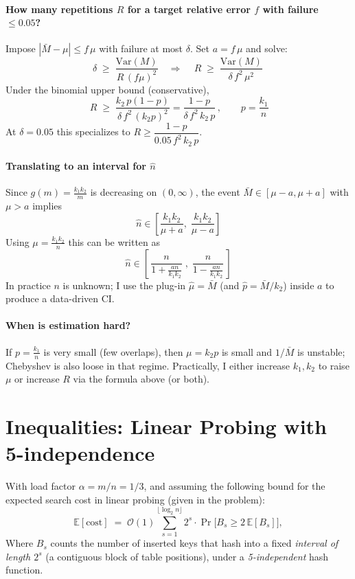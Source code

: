 \documentclass[11pt]{article}
\begin{document}
\paragraph{How many repetitions $R$ for a target relative error $f$ with failure $\le 0.05$?}
Impose $|\bar M-\mu|\le f\,\mu$ with failure at most $\delta$. Set $a=f\,\mu$ and solve:
\[
\delta\;\ge\; \frac{\mathrm{Var}(M)}{R\,(f\mu)^2}
\quad\Longrightarrow\quad
\,R\;\ge\;\frac{\mathrm{Var}(M)}{\delta\,f^2\,\mu^2}\,
\]
Under the binomial upper bound (conservative),
\[
\,R\;\ge\;\frac{k_2\,p(1-p)}{\delta\,f^2\,(k_2p)^2}
=\frac{1-p}{\delta\,f^2\,k_2\,p}\,,
\qquad p=\frac{k_1}{n}
\]
At $\delta=0.05$ this specializes to $R\ge \dfrac{1-p}{0.05\,f^2\,k_2\,p}$.

\paragraph{Translating to an interval for $\hat n$}
Since $g(m)=\frac{k_1k_2}{m}$ is decreasing on $(0,\infty)$, the event
$\bar M\in[\mu-a,\mu+a]$ with $\mu>a$ implies
\[
\hat n \in \left[\frac{k_1k_2}{\mu+a},\;\frac{k_1k_2}{\mu-a}\right]
\]
Using $\mu=\frac{k_1k_2}{n}$ this can be written as
\[
\hat n \in \left[\,\frac{n}{1+\frac{a n}{k_1k_2}}\;,\;\frac{n}{1-\frac{a n}{k_1k_2}}\,\right]
\]
In practice $n$ is unknown; I use the plug-in $\hat \mu=\bar M$ (and $\hat p=\bar M/k_2$) inside $a$ to produce a data-driven CI.

\paragraph{When is estimation hard?}
If $p=\frac{k_1}{n}$ is very small (few overlaps), then $\mu=k_2p$ is small and $1/\bar M$ is unstable; Chebyshev is also loose in that regime. Practically, I either increase $k_1,k_2$ to raise $\mu$ or increase $R$ via the formula above (or both).

\newpage

\section{Inequalities: Linear Probing with 5-independence}
With load factor \(\alpha=m/n=1/3\), and assuming the following bound for the expected search cost in linear probing (given in the problem):
\[
  \mathbb{E}[\text{cost}] \;=\; \mathcal{O}(1)\sum_{s=1}^{\lfloor \log_2 n \rfloor} 2^s \cdot \Pr\big[B_s \ge 2\,\mathbb{E}[B_s]\big],
\]
Where \(B_s\) counts the number of inserted keys that hash into a fixed \emph{interval of length \(2^s\)} (a contiguous block of table positions), under a \emph{5-independent} hash function.
\end{document}
